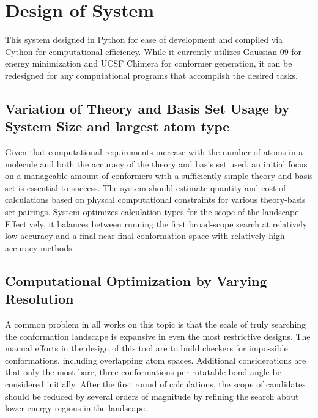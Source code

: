 \section{Design of System}

This system designed in Python for ease of development and compiled via Cython for computational efficiency. 
While it currently utilizes Gaussian 09 for energy minimization and UCSF Chimera for conformer generation, it can be redesigned for any computational programs that accomplish the desired tasks.

\subsection{Variation of Theory and Basis Set Usage by System Size and largest atom type}

Given that computational requirements increase with the number of atoms in a molecule and both the accuracy of the theory and basis set used, an initial focus on a manageable amount of conformers with a sufficiently simple theory and basis set is essential to success.
The system should estimate quantity and cost of calculations based on physcal computational constraints for various theory-basis set pairings. 
System optimizes calculation types for the scope of the landscape.
Effectively, it balances between running the first broad-scope search at relatively low accuracy and a final near-final conformation space with relatively high accuracy methods.


\subsection{Computational Optimization by Varying Resolution}

A common problem in all works on this topic is that the scale of truly searching the conformation landscape is expansive in even the most restrictive designs. 
The manual efforts in the design of this tool are to build checkers for impossible conformations, including overlapping atom spaces.
Additional considerations are that only the most bare, three conformations per rotatable bond angle be considered initially.
After the first round of calculations, the scope of candidates should be reduced by several orders of magnitude by refining the search about lower energy regions in the landscape.


